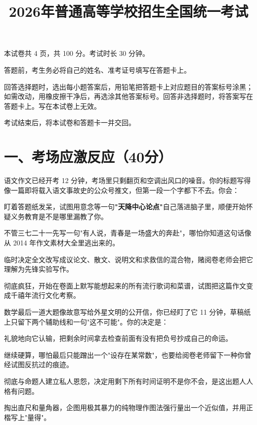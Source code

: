 \documentclass{exam-zh}
\title{2026年普通高等学校招生全国统一考试}
\begin{document}
\secret
\maketitle

本试卷共 4 页，共 100 分。考试时长 30 分钟。

\begin{notice}
  \item 答题前，考生务必将自己的姓名、准考证号填写在答题卡上。
  \item 回答选择题时，选出每小题答案后，用铅笔把答题卡上对应题目的答案标号涂黑；如需改动，用橡皮擦干净后，再选涂其他答案标号。回答非选择题时，将答案写在答题卡上。写在本试卷上无效。
  \item 考试结束后，将本试卷和答题卡一并交回。
\end{notice}

\section{一、考场应激反应（40分）}

\begin{question}[points = 5]
  语文作文已经开考 12 分钟，考场里只剩翻页和空调出风口的噪音。你的标题写得像一篇即将载入语文事故史的公众号推文，但第一段一个字都下不去。你会：
  \begin{choices}
    \item 盯着答题纸发呆，试图用意念等一句\textbf{"天降中心论点"}自己落进脑子里，顺便开始怀疑义务教育是不是哪里漏教了你。
    \item 不管三七二十一先写一句"有人说，青春是一场盛大的奔赴"，哪怕你知道这句话像从 2014 年作文素材大全里逃出来的。
    \item 临时决定全文改写成议论文、散文、说明文和求救信的混合物，赌阅卷老师会把它理解为先锋实验写作。
    \item 彻底疯狂，开始在卷面上默写能想起来的所有流行歌词和菜谱，试图把这篇作文变成千禧年流行文化考察。
  \end{choices}
\end{question}

\begin{question}[points = 5]
  数学最后一道大题像故意写给外星文明的公开信，你已经盯了它 11 分钟，草稿纸上只留下两个辅助线和一句"这不可能"。你的决定是：
  \begin{choices}
    \item 礼貌地向它认输，把剩余时间拿去检查前面有没有把负号抄成自己的命运。
    \item 继续硬算，哪怕最后只能蹭出一个"设存在某常数"，也要给阅卷老师留下一种你曾经试图反抗过的痕迹。
    \item 彻底与命题人建立私人恩怨，决定用剩下所有时间证明不是你不会，是这出题人人格有问题。
    \item 掏出直尺和量角器，企图用极其暴力的纯物理作图法强行量出一个近似值，并用正楷写上"量得"。
  \end{choices}
\end{question}
\end{document}
